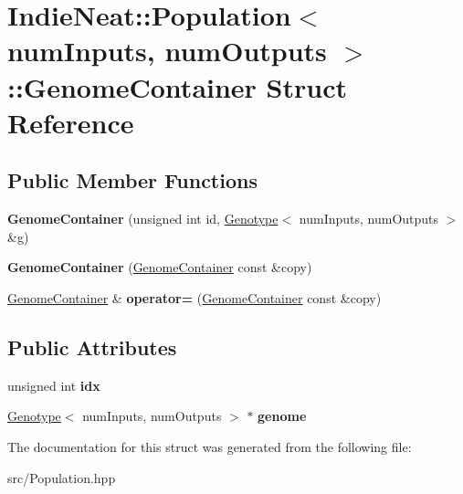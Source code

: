 \hypertarget{struct_indie_neat_1_1_population_1_1_genome_container}{}\section{Indie\+Neat\+:\+:Population$<$ num\+Inputs, num\+Outputs $>$\+:\+:Genome\+Container Struct Reference}
\label{struct_indie_neat_1_1_population_1_1_genome_container}
\subsection*{Public Member Functions}
\begin{DoxyCompactItemize}
\item 
\mbox{\label{struct_indie_neat_1_1_population_1_1_genome_container_a85a60321b3d308c05b0bdb15ecff6e06}} 
{\bfseries Genome\+Container} (unsigned int id, \hyperlink{class_indie_neat_1_1_genotype}{Genotype}$<$ num\+Inputs, num\+Outputs $>$ \&g)
\item 
\mbox{\label{struct_indie_neat_1_1_population_1_1_genome_container_a1da0baf8fba962d13db18d200ea7f1a1}} 
{\bfseries Genome\+Container} (\hyperlink{struct_indie_neat_1_1_population_1_1_genome_container}{Genome\+Container} const \&copy)
\item 
\mbox{\label{struct_indie_neat_1_1_population_1_1_genome_container_aa9a6435f66f80cfda0169b07235b8821}} 
\hyperlink{struct_indie_neat_1_1_population_1_1_genome_container}{Genome\+Container} \& {\bfseries operator=} (\hyperlink{struct_indie_neat_1_1_population_1_1_genome_container}{Genome\+Container} const \&copy)
\end{DoxyCompactItemize}
\subsection*{Public Attributes}
\begin{DoxyCompactItemize}
\item 
\mbox{\label{struct_indie_neat_1_1_population_1_1_genome_container_ac2a981c2c2e2737408fa51e586642883}} 
unsigned int {\bfseries idx}
\item 
\mbox{\label{struct_indie_neat_1_1_population_1_1_genome_container_a4ec95dc29ab8fa7544fdbb664f027dcc}} 
\hyperlink{class_indie_neat_1_1_genotype}{Genotype}$<$ num\+Inputs, num\+Outputs $>$ $\ast$ {\bfseries genome}
\end{DoxyCompactItemize}


The documentation for this struct was generated from the following file\+:\begin{DoxyCompactItemize}
\item 
src/Population.\+hpp\end{DoxyCompactItemize}
